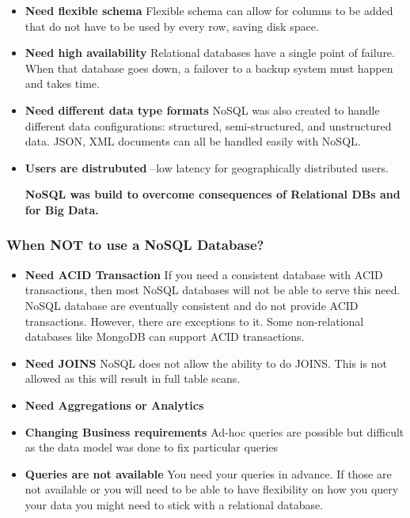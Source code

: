 \documentclass[
	paper=a4,%
	pagesize,%
	8pt, fleqn,%
	headings=small,%
	notitlepage,%
	parskip=never]%
	{scrreprt}
\begin{document}
\begin{multicols*}{3}
\begin{itemize}
\item \textbf{Need flexible schema} Flexible schema can allow for columns to be added that do not have to be used by every row, saving disk space.

\item \textbf{Need high availability} Relational databases have a single point of failure. When that database goes down, a failover to a backup system must happen and takes time.

\item \textbf{Need different data type formats} NoSQL was also created to handle different data configurations: structured, semi-structured, and unstructured data. JSON, XML documents can all be handled easily with NoSQL.

\item \textbf{Users are distrubuted} --low latency for geographically distributed users. 

\textbf{NoSQL was build to overcome consequences of Relational DBs and for Big Data.}

\end{itemize}

\subsubsection{When NOT to use a NoSQL Database?}
\begin{itemize}
\item \textbf{Need ACID Transaction} If you need a consistent database with ACID transactions, then most NoSQL databases will not be able to serve this need. NoSQL database are eventually consistent and do not provide ACID transactions. However, there are exceptions to it. Some non-relational databases like MongoDB can support ACID transactions.

\item \textbf{Need JOINS} NoSQL does not allow the ability to do JOINS. This is not allowed as this will result in full table scans.

\item \textbf{Need Aggregations or Analytics}

\item \textbf{Changing Business requirements} Ad-hoc queries are possible but difficult as the data model was done to fix particular queries

\item \textbf{Queries are not available} You need your queries in advance. If those are not available or you will need to be able to have flexibility on how you query your data you might need to stick with a relational database.


\end{itemize}
\end{multicols*}
\end{document}
